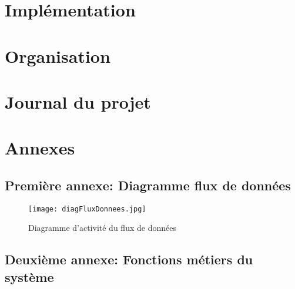 \documentclass[12pt,fleqn]{book} %
\begin{document}
\part{Implémentation}

%
% 


%
%

\part{Organisation}


\part{Journal du projet}



\appendix
\part{Annexes}
\chapter{Première annexe: Diagramme flux de données}

\begin{figure}[h!]
\centering\texttt{[image: diagFluxDonnees.jpg]}
\caption{\label{fig:donnees} Diagramme d'activité du flux de données}
\end{figure}

\chapter{Deuxième annexe: Fonctions métiers du système}
\end{document}
